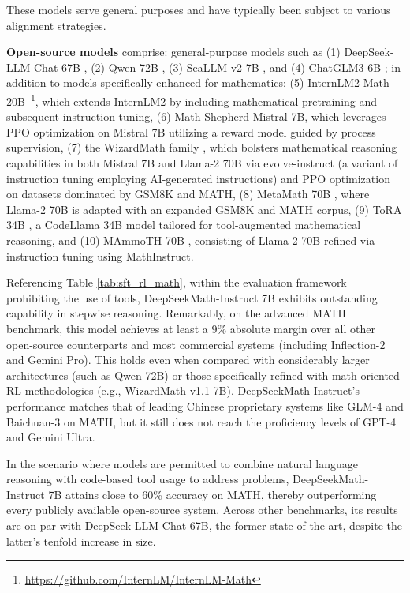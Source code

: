 These models serve general purposes and have typically been subject to various alignment strategies.
    \item \textbf{Open-source models} comprise: general-purpose models such as (1) DeepSeek-LLM-Chat 67B \citep{deepseek-llm}, (2) Qwen 72B \citep{qwen}, (3) SeaLLM-v2 7B \citep{seallm}, and (4) ChatGLM3 6B \citep{chatglm3}; in addition to models specifically enhanced for mathematics: (5) InternLM2-Math 20B~\footnote{\url{https://github.com/InternLM/InternLM-Math}}, which extends InternLM2 by including mathematical pretraining and subsequent instruction tuning, (6) Math-Shepherd-Mistral 7B, which leverages PPO optimization \citep{schulman2017proximal} on Mistral 7B \citep{mistral} utilizing a reward model guided by process supervision, (7) the WizardMath family \citep{wizardmath}, which bolsters mathematical reasoning capabilities in both Mistral 7B and Llama-2 70B \citep{llama2} via evolve-instruct (a variant of instruction tuning employing AI-generated instructions) and PPO optimization on datasets dominated by GSM8K and MATH, (8) MetaMath 70B \citep{metamath}, where Llama-2 70B is adapted with an expanded GSM8K and MATH corpus, (9) ToRA 34B \cite{tora}, a CodeLlama 34B model tailored for tool-augmented mathematical reasoning, and (10) MAmmoTH 70B \citep{MathInstruct}, consisting of Llama-2 70B refined via instruction tuning using MathInstruct.

Referencing Table \ref{tab:sft_rl_math}, within the evaluation framework prohibiting the use of tools, DeepSeekMath-Instruct 7B exhibits outstanding capability in stepwise reasoning. Remarkably, on the advanced MATH benchmark, this model achieves at least a 9\% absolute margin over all other open-source counterparts and most commercial systems (including Inflection-2 and Gemini Pro). This holds even when compared with considerably larger architectures (such as Qwen 72B) or those specifically refined with math-oriented RL methodologies (e.g., WizardMath-v1.1 7B). DeepSeekMath-Instruct’s performance matches that of leading Chinese proprietary systems like GLM-4 and Baichuan-3 on MATH, but it still does not reach the proficiency levels of GPT-4 and Gemini Ultra.

In the scenario where models are permitted to combine natural language reasoning with code-based tool usage to address problems, DeepSeekMath-Instruct 7B attains close to 60\% accuracy on MATH, thereby outperforming every publicly available open-source system. Across other benchmarks, its results are on par with DeepSeek-LLM-Chat 67B, the former state-of-the-art, despite the latter's tenfold increase in size.

